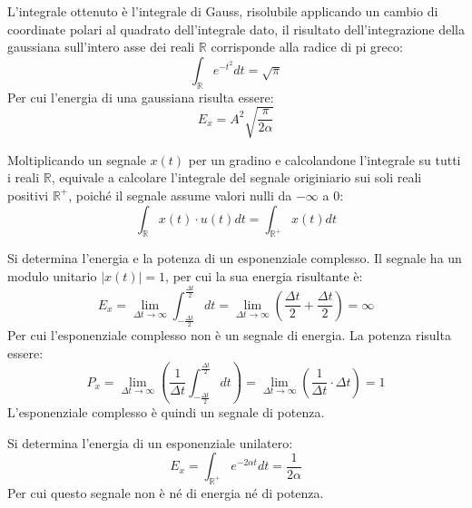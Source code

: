 \documentclass{article}
\numberwithin{equation}{subsection}
\begin{document}
L'integrale ottenuto è l'integrale di Gauss, risolubile applicando un cambio di coordinate polari al quadrato dell'integrale dato, il risultato dell'integrazione della 
gaussiana sull'intero asse dei reali $\mathbb{R}$ corrisponde alla radice di pi greco: 
\begin{equation*}
    \displaystyle\int_{\mathbb{R}}e^{-t^2}dt=\sqrt\pi
\end{equation*}
Per cui l'energia di una gaussiana risulta essere:
\begin{equation}
    E_x=A^2\displaystyle\sqrt{\frac{\pi}{2\alpha}}
\end{equation}




Moltiplicando un segnale $x(t)$ per un gradino e calcolandone l'integrale su tutti i reali $\mathbb{R}$, equivale a calcolare l'integrale del segnale originiario sui soli 
reali positivi $\mathbb{R}^+$, poiché il segnale assume valori nulli da $-\infty$ a $0$: 
\begin{equation*}
    \displaystyle\int_{\mathbb{R}}x(t)\cdot u(t)dt=\int_{\mathbb{R}^+}x(t)dt
\end{equation*}



Si determina l'energia e la potenza di un esponenziale complesso. Il segnale ha un modulo unitario $|x(t)|=1$, per cui la sua energia risultante è:
\begin{equation*}
    E_x=\lim_{\Delta t\to\infty}\displaystyle\int_{-\frac{\Delta t}{2}}^{\frac{\Delta t}{2}}dt=\lim_{\Delta t\to\infty}\left(\frac{\Delta t}{2}+\frac{\Delta t}{2}\right)=\infty
\end{equation*}
Per cui l'esponenziale complesso non è un segnale di energia. La potenza risulta essere:
\begin{equation*}
    P_x=\lim_{\Delta t\to\infty}\displaystyle\left(\frac{1}{\Delta t}\int_{-\frac{\Delta t}{2}}^{\frac{\Delta t}{2}}dt\right)=\lim_{\Delta t\to\infty}\left(\frac{1}{\Delta t}\cdot\Delta t\right)=1
\end{equation*}
L'esponenziale complesso è quindi un segnale di potenza. 



Si determina l'energia di un esponenziale unilatero:
\begin{equation*}
    E_x=\displaystyle\int_{\mathbb{R}^+}e^{-2\alpha t}dt=\frac{1}{2\alpha}
\end{equation*}
Per cui questo segnale non è né di energia né di potenza. 
\end{document}
